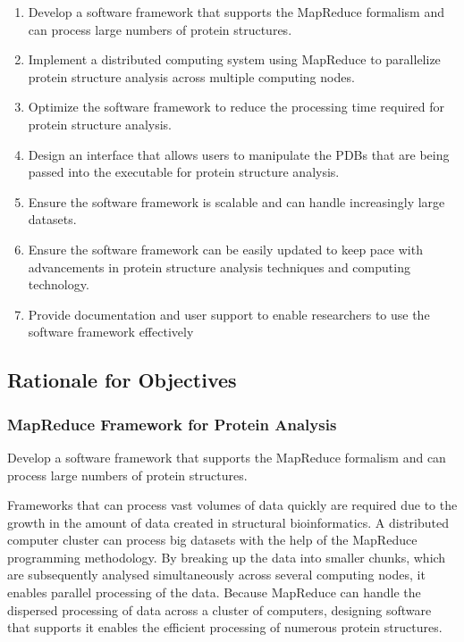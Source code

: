 \documentclass[]{final_report}
\begin{document}
\begin{enumerate}
    \item Develop a software framework that supports the MapReduce formalism and can process large numbers of protein structures.
    \item Implement a distributed computing system using MapReduce to parallelize protein structure analysis across multiple computing nodes.
    \item Optimize the software framework to reduce the processing time required for protein structure analysis.
    \item Design an interface that allows users to manipulate the PDBs that are being passed into the executable for protein structure analysis.
    \item Ensure the software framework is scalable and can handle increasingly large datasets.
    \item Ensure the software framework can be easily updated to keep pace with advancements in protein structure analysis techniques and computing technology.
    \item Provide documentation and user support to enable researchers to use the software framework effectively
\end{enumerate}
\clearpage

\subsection{Rationale for Objectives}

\subsubsection{MapReduce Framework for Protein Analysis}

\begin{displayquote}
    Develop a software framework that supports the MapReduce formalism and can process large numbers of protein structures.
\end{displayquote}

Frameworks that can process vast volumes of data quickly are required due to the growth in the amount of data created in structural bioinformatics. A distributed computer cluster can process big datasets with the help of the MapReduce programming methodology. By breaking up the data into smaller chunks, which are subsequently analysed simultaneously across several computing nodes, it enables parallel processing of the data. Because MapReduce can handle the dispersed processing of data across a cluster of computers, designing software that supports it enables the efficient processing of numerous protein structures.
\end{document}
